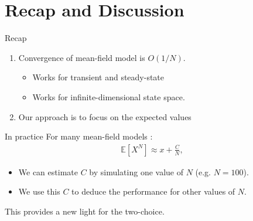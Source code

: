 \documentclass{beamer}
\newcommand\esp[1]{\mathbb{E}\left[#1\right]}
\begin{document}
\section{Recap and Discussion}

\begin{frame}{Recap}
  
  \begin{enumerate}
  \item Convergence of mean-field model is $O(1/N)$. 
    \begin{itemize}
    \item Works for transient and steady-state 
    \item Works for infinite-dimensional state space. 
    \end{itemize}\bigskip
    
  \item Our approach is to focus on the expected values
    \begin{center}
      \hspace{-1cm}
    \end{center}
  \end{enumerate}
\end{frame}

\begin{frame}{In practice}
  For many mean-field models : 
  \begin{align*}
    \esp{X^N} \approx x + \frac{C}{N},
  \end{align*}
  \begin{itemize}
  \item We can estimate $C$
    by simulating one value of $N$ (e.g. $N=100$).
  \item We use this $C$ to deduce the performance for other values of
    $N$.  
  \end{itemize}
  \bigskip
  
  This provides a new light for the two-choice. 
\end{frame}
\end{document}
